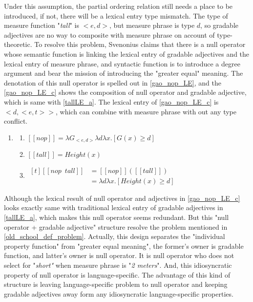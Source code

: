 \documentclass{ctexart}
\let \cite \parencite
\begin{document}
Under this assumption, the partial ordering relation still needs a place to be introduced, if not, there will be a lexical entry type mismatch. The type of measure function "\textit{tall}" is $<e,d>$, but measure phrase is type $d$, so gradable adjectives are no way to composite with measure phrase on account of type-theoretic. To resolve this problem, Svenonius\cite{svenonius2006} claims that there is a null operator whose semantic function is linking the lexical entry of gradable adjectives and the lexical entry of measure phrase, and syntactic function is to introduce a degree argument and bear the mission of introducing the "greater equal" meaning. The denotation of this null operator is spelled out in \ref{gao_nop_LE}, and the \ref{gao_nop_LE_c} shows the composition of null operator and gradable adjective, which is same with \ref{tallLE_a}. The lexical entry of \ref{gao_nop_LE_c} is $<d,<e,t>>$, which can combine with measure phrase with out any type conflict.

\begin{enumerate}[resume]
    \item \label{gao_nop_LE}

    \begin{enumerate}[ref=(\arabic{enumi}\alph*)]
        \item \label{gao_nop_LE_a} 
        $[\![nop]\!]=\lambda G_{<e,d>}\lambda d \lambda x.[G(x) \geq d]$

        \item \label{gao_nop_LE_b} 
        $[\![tall]\!]=Height(x)$

        \item \label{gao_nop_LE_c} 
        $\begin{aligned}[t]
            [\![nop \enspace tall]\!] &= [\![nop]\!]([\![tall]\!]) \\
            &= \lambda d \lambda x.[Height(x) \geq d]
        \end{aligned}$

    \end{enumerate}
\end{enumerate}

Although the lexical result of null operator and adjectives in \ref{gao_nop_LE_c} looks exactly same with traditional lexical entry of gradable adjectives in \ref{tallLE_a}, which makes this null operator seems redundant. But this "null operator + gradable adjective" structure resolve the problem mentioned in \ref{old_school_def_problem}. Actually, this design separates the "individual property function" from "greater equal meaning", the former's owner is gradable function, and latter's owner is null operator. It is null operator who does not select for "\textit{short"} when measure phrase is "\textit{2 meters}". And, this idiosyncratic property of null operator is language-specific. The advantage of this kind of structure is leaving language-specific problem to null operator and keeping gradable adjectives away form any idiosyncratic language-specific properties.
\end{document}
